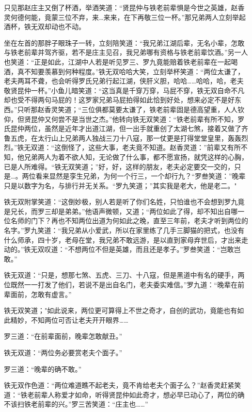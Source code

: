 \documentclass[12pt,oneside]{book}
\begin{document}
只见那赵庄主又倒了杯酒，举酒笑道：``贤昆仲与铁老前辈惧是今世之英雄，赵香灵何德何能，竟蒙三位不弃，来\ldots 来来，在下再敬三位一杯。''那兄弟两人立刻举起酒杯，铁无双却动也不动。

坐在左首的那胖子眼珠子一转，立刻陪笑道：``我兄弟江湖后辈，无名小辈，怎敢与铁老前辈并驾齐驱，若不是庄主见召，我兄弟哪有资格与铁老前辈饮酒。''另一人也笑道：``正是如此，江湖中人若是听见罗三、罗九竟能赔着铁老前辈在一起喝酒，真不知要羡慕到何种程度。''铁无双哈哈大笑，立刻举杯笑道：``两位太谦了，老夫两耳不聋，也会听得罗氏兄弟行起江湖，侠肝义胆，哈哈\ldots\ldots 哈哈，哈，老夫敬贤昆仲一杯。''小鱼儿暗笑道：``这当真是千穿万穿，马屁不穿，铁无双自命不凡却也受不得两句马屁的！这罗家兄弟马屁拍得如此恰到好处，想来必定不是好东西。''只听那赵香灵笑道；``三位俱都莫要太谦了，铁老前辈固是德高望重，人人钦仰，但贤昆仲又何尝不是当世之杰。''他转向铁无双笑道：``铁老前辈有所不知，罗氏昆仲两位，虽然是近年才出道江湖，但一出手就重创了太湖七煞，接着又做了齐鲁五虎，在太行山上兄弟两人独战三刀十八寇，那一仗更是打得堂堂皇里，轰轰烈烈。''铁无双道：``这倒怪了，这些大事，老夫竟不知道。赵香灵道：''前辈又有所不知，他兄弟两人为着不欲人知，无论做了什么事，都不愿宣扬，就凭这样的心胸，已是人所难得。``铁无双笑道；''好，好，这样的朋友，老夫必定要交一交的，只是\ldots。两位看来显然是孪生兄弟，为何一个行三，一个却行九？``罗叁笑道：''晚辈只是以数字为名，与排行并无关系。``罗九笑道；''其实我是老大，他是老二。"

铁无双附掌笑道：``这倒妙极，别人若是听了你们名姓，只怕谁也不会想到罗九竟是兄长，而罗三却是弟弟。''他语声微顿，又道；``两位如此了得，却不知出自哪一位名师的门下？再也不知两位出道为何如此之晚，直至三年前，老夫才听到两位的名字。''罗九笑道：``我兄弟从小爱武，所以在家里练了几手三脚猫的把式，也没有什么师承，四十岁，老母在堂，我兄弟不敢远游，是以直到家母弃世后，才出来走动的。''铁无双叹道：``不想两位不但是英雄，而且还是孝子。''罗叁笑道：``岂敢岂敢。''

铁无双道：``只是，想那七煞、五虎、三刀、十八寇，但是黑道中有名的硬手，两位既然一一打发了他们，若说不是出自名门，老夫委实难信。''罗九道：``晚辈在前辈面前，怎敢有虚言。''

铁无双笑道；"如此说来，两位更可算得上不世之奇才，自创的武功，竟能也有如此精妙，不知两位可否让老夫开开眼界\ldots\ldots{}

罗三道：``在前辈面前，晚辈怎敢献丑。''

铁无双道：``两位务必要赏老夫个面子。''

罗三道：``晚辈的确不敢。''

铁无双作色道：``两位难道瞧不起老夫，竟不肯给老夫个面子么？''赵香灵赶紧笑道：``铁老前辈人称爱才如命，听得贤昆仲如此奇才，想必早已动心了，两位的确不该扫铁老前辈的兴。''罗三苦笑道：``庄主也\ldots\ldots{}''
\end{document}
